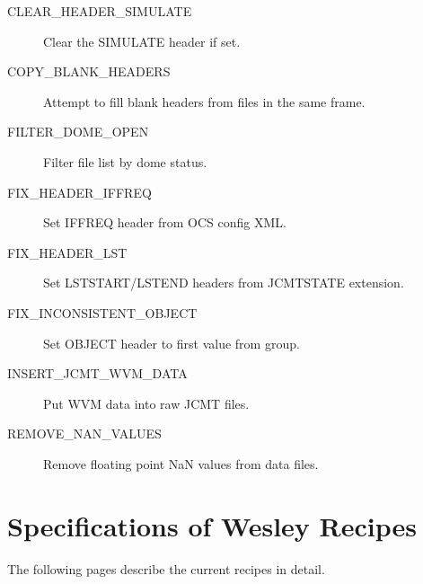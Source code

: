 \documentclass[twoside,11pt,nolof]{starlink}
\begin{document}
\begin{description}
\item[CLEAR\_HEADER\_SIMULATE] \mbox {}
Clear the SIMULATE header if set.

\item[COPY\_BLANK\_HEADERS] \mbox {}
Attempt to fill blank headers from files in the same frame.

\item[FILTER\_DOME\_OPEN] \mbox {}
Filter file list by dome status.

\item[FIX\_HEADER\_IFFREQ] \mbox {}
Set IFFREQ header from OCS config XML.

\item[FIX\_HEADER\_LST] \mbox {}
Set LSTSTART/LSTEND headers from JCMTSTATE extension.

\item[FIX\_INCONSISTENT\_OBJECT] \mbox {}
Set OBJECT header to first value from group.

\item[INSERT\_JCMT\_WVM\_DATA] \mbox{}
Put WVM data into raw JCMT files.

\item[REMOVE\_NAN\_VALUES] \mbox {}
Remove floating point NaN values from data files.
\end{description}

\newpage

\section{Specifications of Wesley Recipes\label{ap:full}}

The following pages describe the current \wesley{} recipes in detail.


\end{document}
